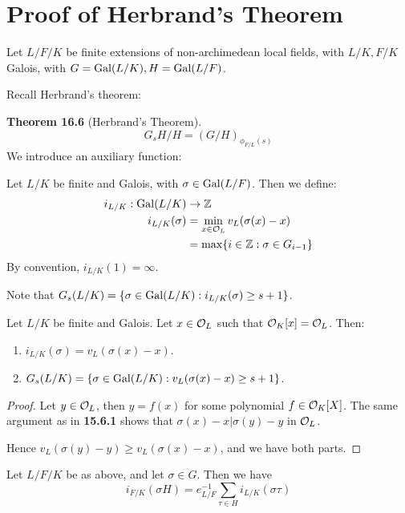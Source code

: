 \documentclass[10pt,a4paper]{article}
\begin{document}
\section{Proof of Herbrand's Theorem}
Let $L/F/K$ be finite extensions of non-archimedean local fields, with $L/K, F/K$ Galois, with $G = \operatorname{Gal}(L/K), H = \operatorname{Gal}(L/F)$.

Recall Herbrand's theorem:

\textbf{Theorem 16.6} (Herbrand's Theorem).
\[G_sH/H = (G/H)_{\phi_{F/L}(s)}\]
We introduce an auxiliary function:
\begin{definition}
  Let $L/K$ be finite and Galois, with $\sigma \in \operatorname{Gal}(L/F)$. Then we define:
  \begin{align*}
    i_{L/K}: \operatorname{Gal}(L/K) & \to \mathbb{Z}\\
    i_{L/K}(\sigma) &= \min_{x \in \mathcal{O}_L} v_L(\sigma(x)-x)\\
    &= \max\{i \in \mathbb{Z}: \sigma \in G_{i-1}\}
  \end{align*}
  By convention, $i_{L/K}(1) = \infty$.
\end{definition}
Note that $G_s(L/K) = \{\sigma \in \operatorname{Gal}(L/K):i_{L/K}(\sigma) \geq s+1\}$.
\begin{lemma}
  Let $L/K$ be finite and Galois. Let $x \in \mathcal{O}_L$ such that $\mathcal{O}_K[x] = \mathcal{O}_L$. Then:
  \begin{enumerate}
    \item $i_{L/K}(\sigma) = v_L(\sigma(x)-x)$.
    \item $G_s(L/K) = \{\sigma \in \operatorname{Gal}(L/K): v_L(\sigma(x)-x)\geq s+1\}$.
  \end{enumerate}
\end{lemma}
\begin{proof}
  Let $y \in \mathcal{O}_L$, then $y = f(x)$ for some polynomial $f \in \mathcal{O}_K[X]$. The same argument as in \textbf{15.6.1} shows that $\sigma(x)-x | \sigma(y)-y$ in $\mathcal{O}_L$.

  Hence $v_L(\sigma(y)-y) \geq v_L(\sigma(x)-x)$, and we have both parts.
\end{proof}
\begin{proposition}
  Let $L/F/K$ be as above, and let $\sigma \in G$. Then we have
  \[i_{F/K}(\sigma H) = e_{L/F}^{-1}\sum_{\tau \in H}i_{L/K}(\sigma \tau)\]
\end{proposition}
\end{document}
